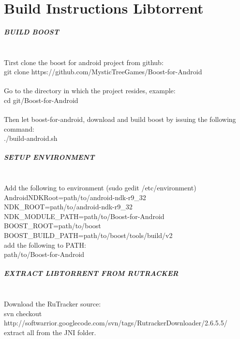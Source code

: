 \chapter{Build Instructions Libtorrent}
\label{sec:build_libt}

\paragraph{BUILD BOOST}\mbox{}\\
Tirst clone the boost for android project from github:\\
git clone https://github.com/MysticTreeGames/Boost-for-Android\\
\\
Go to the directory in which the project resides, example:\\
cd git/Boost-for-Android\\
\\
Then let boost-for-android, download and build boost by issuing the following command:\\
./build-android.sh\\

\paragraph{SETUP ENVIRONMENT}\mbox{}\\
Add the following to environment (sudo gedit /etc/environment)\\
AndroidNDKRoot=path/to/android-ndk-r9\_32\\
NDK\_ROOT=path/to/android-ndk-r9\_32\\
NDK\_MODULE\_PATH=path/to/Boost-for-Android\\
BOOST\_ROOT=path/to/boost\\
BOOST\_BUILD\_PATH=path/to/boost/tools/build/v2\\

add the following to PATH:\\
path/to/Boost-for-Android\\

\paragraph{EXTRACT LIBTORRENT FROM RUTRACKER}\mbox{}\\
Download the RuTracker source:\\
svn checkout http://softwarrior.googlecode.com/svn/tags/RutrackerDownloader/2.6.5.5/\\
extract all from the JNI folder.\\

